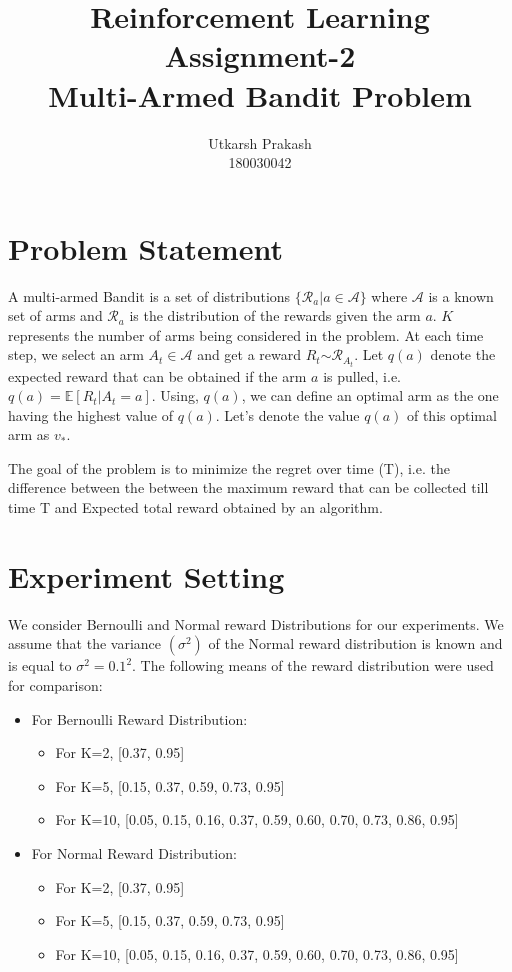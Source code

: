 \documentclass{article}
\title{Reinforcement Learning Assignment-2 \\
	\Large Multi-Armed Bandit Problem \\}
\begin{document}
\author{Utkarsh Prakash \\ \normalsize 180030042}
\maketitle
\section{Problem Statement}
	A multi-armed Bandit is a set of distributions $\{\mathcal{R}_{a} | a \in \mathcal{A}\}$ where $\mathcal{A}$ is a known set of arms and $\mathcal{R}_{a}$ is the
	distribution of the rewards given the arm $a$. $K$ represents the number of arms being considered in the problem. At each time step, we select an arm 
	$A_{t} \in \mathcal{A}$ and get a reward $R_{t} \stackrel{}{\sim}
	\mathcal{R}_{A_{t}}$. Let $q(a)$ denote the expected reward that can be obtained if the arm $a$ is pulled, i.e. $q(a) = \mathbb{E}[R_{t} | A_{t} = a]$. Using,
	$q(a)$, we can define an optimal arm as the one having the highest value of $q(a)$. Let's denote the value $q(a)$ of this optimal arm as $v_{*}$.  \par

	\noindent %
	The goal of the problem is to minimize the regret over time (T), i.e. the difference between the between the maximum reward that can be collected till time T
	and Expected total reward obtained by an algorithm.
\section{Experiment Setting}
	We consider Bernoulli and Normal reward Distributions for our experiments. We assume that the variance $(\sigma^{2})$ of the Normal reward distribution is known
	and is equal to $\sigma^{2} = 0.1^{2}$. The following means of the reward distribution were used for comparison:
	\begin{itemize}
		\item For Bernoulli Reward Distribution:
		\begin{itemize}
			\item For K=2, [0.37, 0.95]
			\item For K=5, [0.15, 0.37, 0.59, 0.73, 0.95]
			\item For K=10, [0.05, 0.15, 0.16, 0.37, 0.59, 0.60, 0.70, 0.73, 0.86, 0.95]
		\end{itemize}
		\item For Normal Reward Distribution:
		\begin{itemize}
			\item For K=2, [0.37, 0.95]
			\item For K=5, [0.15, 0.37, 0.59, 0.73, 0.95]
			\item For K=10, [0.05, 0.15, 0.16, 0.37, 0.59, 0.60, 0.70, 0.73, 0.86, 0.95]
		\end{itemize}
	\end{itemize}
	\par
	
\end{document}
